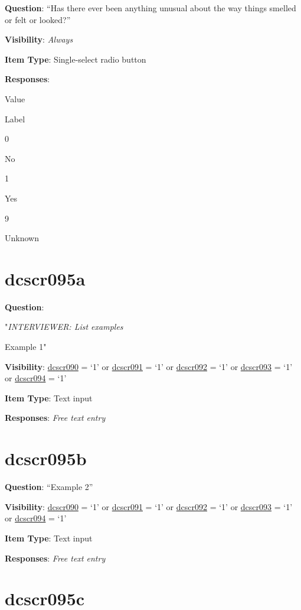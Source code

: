 \documentclass[]{book}
\begin{document}
\textbf{Question}: ``Has there ever been anything unusual about the way things smelled or felt or looked?''

\textbf{Visibility}: \emph{Always}

\textbf{Item Type}: Single-select radio button

\textbf{Responses}:

Value

Label

0

No

1

Yes

9

Unknown

\hypertarget{dcscr095a}{%
\section{dcscr095a}\label{dcscr095a}}

\textbf{Question}:

"\emph{INTERVIEWER: List examples}

Example 1"

\textbf{Visibility}: \protect\hyperlink{dcscr090}{dcscr090} = `1' or \protect\hyperlink{dcscr091}{dcscr091} = `1' or \protect\hyperlink{dcscr092}{dcscr092} = `1' or \protect\hyperlink{dcscr093}{dcscr093} = `1' or \protect\hyperlink{dcscr094}{dcscr094} = `1'

\textbf{Item Type}: Text input

\textbf{Responses}: \emph{Free text entry}

\hypertarget{dcscr095b}{%
\section{dcscr095b}\label{dcscr095b}}

\textbf{Question}: ``Example 2''

\textbf{Visibility}: \protect\hyperlink{dcscr090}{dcscr090} = `1' or \protect\hyperlink{dcscr091}{dcscr091} = `1' or \protect\hyperlink{dcscr092}{dcscr092} = `1' or \protect\hyperlink{dcscr093}{dcscr093} = `1' or \protect\hyperlink{dcscr094}{dcscr094} = `1'

\textbf{Item Type}: Text input

\textbf{Responses}: \emph{Free text entry}

\hypertarget{dcscr095c}{%
\section{dcscr095c}\label{dcscr095c}}
\end{document}

